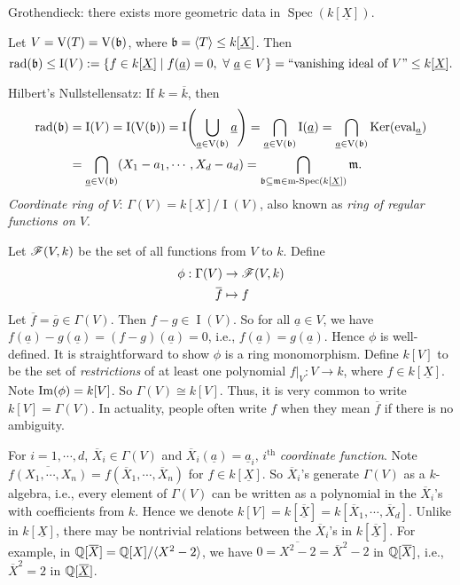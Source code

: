 \begin{remark}
    Grothendieck: there exists more geometric data in $\operatorname{Spec}(k[\underline X])$. \par 
    Let $V = \operatorname{V}(T) = \operatorname{V}(\mathfrak{b})$, where $\mathfrak{b} = \langle T \rangle \leq k[\underline X]$. Then
    \[\operatorname{rad}(\mathfrak{b}) \leq \operatorname{I}(V) := \{f \in k[\underline X] \mid f(\underline a) = 0,\ \forall \  \underline a \in V\} = \text{``vanishing ideal of $V$''} \leq k[\underline X].\]
    \par Hilbert's Nullstellensatz: If $k = \overline k$, then 
    \begin{align*}
        \operatorname{rad}(\mathfrak{b}) &= \operatorname{I}(V) = \operatorname{I}(\operatorname{V}(\mathfrak{b})) = \operatorname{I}\Biggl(\bigcup_{\underline a \in \operatorname{V}(\mathfrak{b})} \underline a \Biggr) = \bigcap_{\underline a \in \operatorname{V}(\mathfrak{b})} \operatorname{I}(\underline a) = \bigcap_{\underline a \in \operatorname{V}(\mathfrak{b})} \operatorname{Ker}(\operatorname{eval}_{\underline a}) \\
        &= \bigcap_{\underline a \in \operatorname{V}(\mathfrak{b})} (X_1-a_1,\cdots,X_d-a_d) = \bigcap_{\mathfrak{b} \subseteq \mathfrak{m} \in \operatorname{m-Spec}(k[\underline X])} \mathfrak{m}.
    \end{align*}
    \emph{Coordinate ring of $V$}: $\Gamma(V) = k[\underline X]/\operatorname{I}(V)$, also known as \emph{ring of regular functions on $V$}. \par 
    Let $\mathscr{F}(V,k)$ be the set of all functions from $V$ to $k$. Define
    \begin{align*}
        \phi: \Gamma(V) & \to \ssF(V,k) \\
        \overbar f &\mapsto f
    \end{align*}
    Let $\overbar f = \overbar g \in \Gamma(V)$. Then $f-g \in \operatorname{I}(V)$. So for all $\underline a \in V$, we have $f(\underline a)-g(\underline a) = (f-g)(\underline a) = 0$, i.e., $f(\underline a) = g(\underline a)$. Hence $\phi$ is well-defined. It is straightforward to show $\phi$ is a ring monomorphism. Define $k[V]$ to be the set of \emph{restrictions} of at least one polynomial $f|_V: V \to k$, where $f \in k[\underline X]$. Note $\operatorname{Im}(\phi) = k[V]$. So $\Gamma(V) \cong k[V]$. Thus, it is very common to write $k[V] = \Gamma(V)$. In actuality, people often write $f$ when they mean $\overbar f$ if there is no ambiguity. \par 
    For $i = 1,\cdots,d$, $\overbar X_i \in \Gamma(V)$ and $\overbar X_i(\underline a) = \underline a_i$, $i^{\text{th}}$ \emph{coordinate function}. Note $\overbar{f(X_1,\cdots,X_n)} = f(\overbar X_1,\cdots,\overbar X_n)$ for $f \in k[\underline X]$. So $\overbar X_i$'s generate $\Gamma(V)$ as a $k$-algebra, i.e., every element of $\Gamma(V)$ can be written as a polynomial in the $\overbar X_i$'s with coefficients from $k$. Hence we denote $k[V]=k[\underline {\overbar X}] = k[\overbar X_1,\cdots,\overbar X_d]$. Unlike in $k[\underline X]$, there may be nontrivial relations between the $\overbar X_i$'s in $k[\overbar {\underline X}]$. For example, in $\bbQ[\overbar X] = \bbQ[X]/\langle X^2-2 \rangle$, we have $0 = \overbar {X^2-2} = \overbar X^2 - 2$ in $\bbQ[\overbar X]$, i.e., $\overbar X^2 = 2$ in $\bbQ[\overbar {\underline X}]$. \par 

\end{remark}
